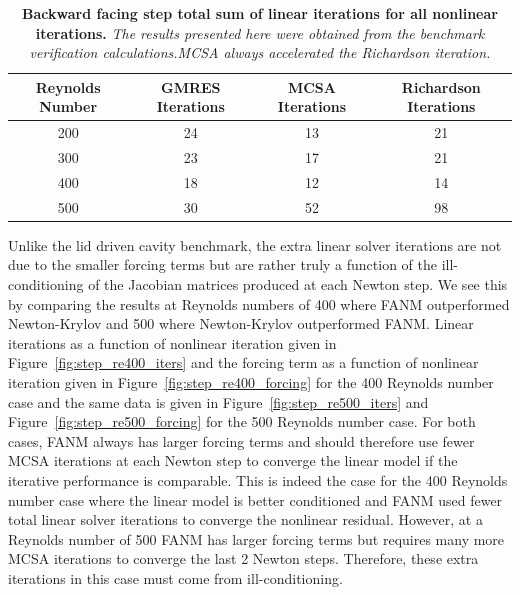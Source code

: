 \begin{table}[h!]
  \begin{center}
    \begin{tabular}{cccc}\hline\hline
      \multicolumn{1}{c}{Reynolds Number}& 
      \multicolumn{1}{c}{GMRES Iterations}&
      \multicolumn{1}{c}{MCSA Iterations}&
      \multicolumn{1}{c}{Richardson Iterations}\\
      \hline
      200 & 24 & 13 & 21\\
      300 & 23 & 17 & 21\\
      400 & 18 & 12 & 14\\
      500 & 30 & 52 & 98\\
      \hline\hline
    \end{tabular}
  \end{center}
  \caption{\textbf{Backward facing step total sum of linear iterations
      for all nonlinear iterations.} \textit{The results presented
      here were obtained from the benchmark verification
      calculations.MCSA always accelerated the Richardson iteration.}}
  \label{tab:step_linear_iter_comparison}
\end{table}

Unlike the lid driven cavity benchmark, the extra linear solver
iterations are not due to the smaller forcing terms but are rather
truly a function of the ill-conditioning of the Jacobian matrices
produced at each Newton step. We see this by comparing the results at
Reynolds numbers of 400 where FANM outperformed Newton-Krylov and 500
where Newton-Krylov outperformed FANM. Linear iterations as a function
of nonlinear iteration given in Figure~\ref{fig:step_re400_iters} and
the forcing term as a function of nonlinear iteration given in
Figure~\ref{fig:step_re400_forcing} for the 400 Reynolds number case
and the same data is given in Figure~\ref{fig:step_re500_iters} and
Figure~\ref{fig:step_re500_forcing} for the 500 Reynolds number
case. For both cases, FANM always has larger forcing terms and should
therefore use fewer MCSA iterations at each Newton step to converge
the linear model if the iterative performance is comparable. This is
indeed the case for the 400 Reynolds number case where the linear
model is better conditioned and FANM used fewer total linear solver
iterations to converge the nonlinear residual. However, at a Reynolds
number of 500 FANM has larger forcing terms but requires many more
MCSA iterations to converge the last 2 Newton steps. Therefore, these
extra iterations in this case must come from ill-conditioning.

